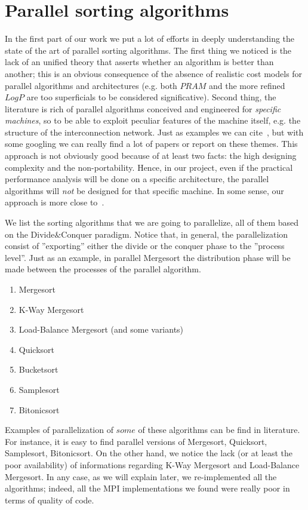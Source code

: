 \section{Parallel sorting algorithms}
In the first part of our work we put a lot of efforts in deeply understanding the state of the art of parallel sorting algorithms. The first thing we noticed is the lack of an unified theory that asserts whether an algorithm is better than another; this is an obvious consequence of the absence of realistic cost models for parallel algorithms and architectures (e.g. both $PRAM$ and the more refined $LogP$ are too superficials to be considered significative). Second thing, the literature is rich of parallel algorithms conceived and engineered for \textit{specific machines}, so to be able to exploit peculiar features of the machine itself, e.g. the structure of the interconnection network. Just as examples we can cite~\cite{CSPA, CSPA2}, but with some googling we can really find a lot of papers or report on these themes. This approach is not obviously good because of at least two facts: the high designing complexity and the non-portability. Hence, in our project, even if the practical performance analysis will be done on a specific architecture, the parallel algorithms will \textit{not} be designed for that specific machine. In some sense, our approach is more close to~\cite{NPSA}.

We list the sorting algorithms that we are going to parallelize, all of them based on the Divide$\&$Conquer paradigm. Notice that, in general, the parallelization consist of ''exporting'' either the divide or the conquer phase to the ''process level''. Just as an example, in parallel Mergesort the distribution phase will be made between the processes of the parallel algorithm. 
\begin{enumerate}
\item Mergesort
\item K-Way Mergesort
\item Load-Balance Mergesort (and some variants) 
\item Quicksort
\item Bucketsort
\item Samplesort
\item Bitonicsort
\end{enumerate}
Examples of parallelization of $some$ of these algorithms can be find in literature. For instance, it is easy to find parallel versions of Mergesort, Quicksort, Samplesort, Bitonicsort. On the other hand, we notice the lack (or at least the poor availability) of informations regarding K-Way Mergesort and Load-Balance Mergesort. In any case, as we will explain later, we re-implemented all the algorithms; indeed, all the MPI implementations we found were really poor in terms of quality of code. 
